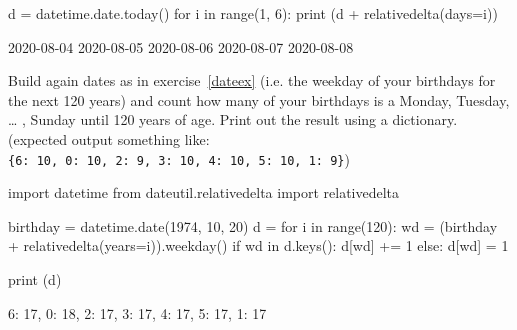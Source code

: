 \begin{ipython}
d = datetime.date.today()
for i in range(1, 6):
     print (d + relativedelta(days=i))

2020-08-04
2020-08-05
2020-08-06
2020-08-07
2020-08-08
\end{ipython}

\begin{question}
Build again dates as in exercise~\ref{dateex} (i.e. the weekday of your birthdays for the next 120 years) and count how many of your birthdays is a Monday, Tuesday, \ldots{} , Sunday until 120 years of age. Print out the result using a dictionary. (expected output something like: \texttt{\{6:\ 10,\ 0:\ 10,\ 2:\ 9,\ 3:\ 10,\ 4:\ 10,\ 5:\ 10,\ 1:\ 9\}})
\end{question}

\begin{solution}
\end{solution}

\begin{ipython}
import datetime
from dateutil.relativedelta import relativedelta

birthday = datetime.date(1974, 10, 20)
d = {}
for i in range(120):
    wd = (birthday + relativedelta(years=i)).weekday() 
    if wd in d.keys():
        d[wd] += 1
    else:
        d[wd] = 1
        
print (d)

{6: 17, 0: 18, 2: 17, 3: 17, 4: 17, 5: 17, 1: 17}
\end{ipython}

